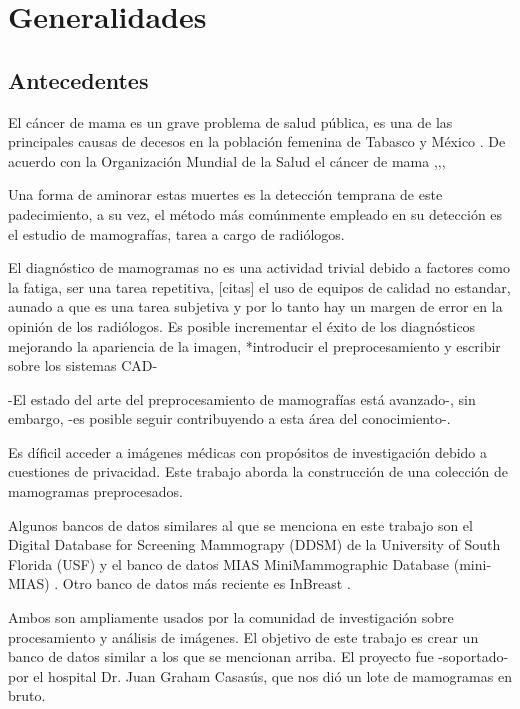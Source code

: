 \chapter{Generalidades}

 \setcounter{page}{1}

\section{Antecedentes}

El cáncer de mama es un grave problema de salud pública, es una de las
principales causas de decesos en la población femenina de Tabasco y México
\cite{inegi, mxcancer}. De acuerdo con la Organización Mundial de la Salud el
cáncer de mama ,,, \cite{cancerreport}

Una forma de aminorar estas muertes es la detección
temprana de este padecimiento, a su vez, el método más comúnmente empleado en
su detección es el estudio de mamografías, tarea a cargo de radiólogos.

El diagnóstico de mamogramas no es una actividad trivial debido a factores como
la fatiga, ser una tarea repetitiva, [citas] el uso de equipos de calidad no
estandar, aunado a que es una tarea subjetiva y por lo tanto hay un margen de
error en la opinión de los radiólogos. Es posible incrementar el éxito de los
diagnósticos mejorando la apariencia de la imagen, *introducir el
preprocesamiento y escribir sobre los sistemas CAD-


-El estado del arte del preprocesamiento de mamografías está avanzado-, sin embargo,
-es posible seguir contribuyendo a esta área del conocimiento-. 

Es díficil acceder a imágenes médicas con propósitos de investigación debido a
cuestiones de privacidad. Este trabajo aborda la construcción de una colección
de mamogramas preprocesados.

Algunos bancos de datos similares al que se menciona en este trabajo son el Digital
Database for Screening Mammograpy (DDSM) de la University of South Florida
(USF) \cite{heath2000digital} y el banco de datos MIAS MiniMammographic
Database (mini-MIAS) \cite{sucklingmini}. Otro banco de datos más reciente es
InBreast \cite{moreira2012inbreast}.

Ambos son ampliamente usados por la comunidad de investigación sobre
procesamiento y análisis de imágenes. El objetivo de este trabajo es crear un
banco de datos similar a los que se mencionan arriba. El proyecto fue
-soportado- por el hospital Dr. Juan Graham Casasús, que nos dió un lote de
mamogramas en bruto.


